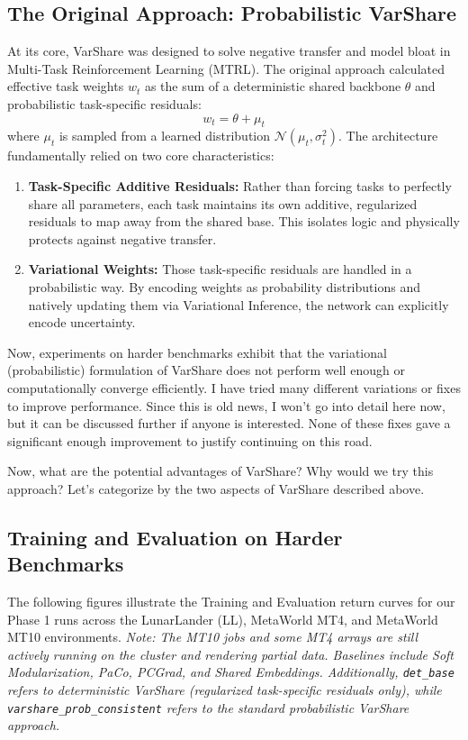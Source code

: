 \documentclass[11pt,a4paper]{article}
\begin{document}
\subsection*{The Original Approach: Probabilistic VarShare}
At its core, VarShare was designed to solve negative transfer and model bloat in Multi-Task Reinforcement Learning (MTRL). The original approach calculated effective task weights $w_t$ as the sum of a deterministic shared backbone $\theta$ and probabilistic task-specific residuals:
\[ w_t = \theta + \mu_t \]
where $\mu_t$ is sampled from a learned distribution $\mathcal{N}(\mu_t, \sigma_t^2)$. The architecture fundamentally relied on two core characteristics:
\begin{enumerate}
    \item \textbf{Task-Specific Additive Residuals:} Rather than forcing tasks to perfectly share all parameters, each task maintains its own additive, regularized residuals to map away from the shared base. This isolates logic and physically protects against negative transfer.
    \item \textbf{Variational Weights:} Those task-specific residuals are handled in a probabilistic way. By encoding weights as probability distributions and natively updating them via Variational Inference, the network can explicitly encode uncertainty.
\end{enumerate}
Now, experiments on harder benchmarks exhibit that the variational (probabilistic) formulation of VarShare does not perform well enough or computationally converge efficiently. I have tried many different variations or fixes to improve performance. Since this is old news, I won't go into detail here now, but it can be discussed further if anyone is interested. None of these fixes gave a significant enough improvement to justify continuing on this road.

Now, what are the potential advantages of VarShare? Why would we try this approach? Let's categorize by the two aspects of VarShare described above.

\subsection*{Training and Evaluation on Harder Benchmarks}

The following figures illustrate the Training and Evaluation return curves for our Phase 1 runs across the LunarLander (LL), MetaWorld MT4, and MetaWorld MT10 environments. 
\textit{Note: The MT10 jobs and some MT4 arrays are still actively running on the cluster and rendering partial data. Baselines include Soft Modularization, PaCo, PCGrad, and Shared Embeddings. Additionally, \texttt{det\_base} refers to deterministic VarShare (regularized task-specific residuals only), while \texttt{varshare\_prob\_consistent} refers to the standard probabilistic VarShare approach.}
\end{document}
